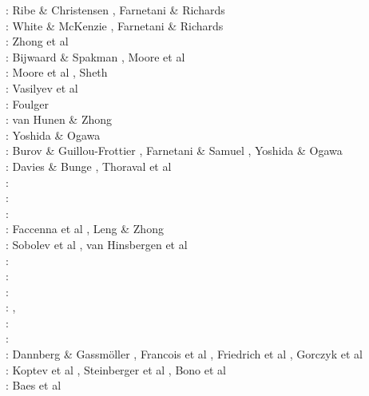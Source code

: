 \begin{scriptsize}
\nineteenninetyfour: Ribe \& Christensen \cite{rich94}, Farnetani \& Richards \cite{fari94}\\
\nineteenninetyfive: White \& McKenzie \cite{whmc95}, Farnetani \& Richards \cite{fari95}\\
\nineteenninetysix: Zhong et al \cite{zhgm96}\\
\nineteenninetyeight: Bijwaard \& Spakman \cite{bisp98}, Moore et al \cite{most98}\\
\nineteenninetynine: Moore et al \cite{most99}, Sheth \cite{shet99}\\
\twothousandone: Vasilyev et al \cite{vapy01}\\
\twothousandtwo: Foulger \cite{foul02}\\
\twothousandthree: van Hunen \& Zhong \cite{vazh03}\\
\twothousandfour: Yoshida \& Ogawa \cite{yoog04}\\
\twothousandfive: Burov \& Guillou-Frottier \cite{bugu05}, Farnetani \& Samuel \cite{fasa05}, 
                  Yoshida \& Ogawa \cite{yoog05}\\
\twothousandsix: Davies \& Bunge \cite{dabu06}, Thoraval et al \cite{thtd06}\\
\twothousandseven: \cite{stco07}\\
\twothousandeight: \cite{uegs08}\cite{slee08}\\
\twothousandnine: \cite{bucl09}\cite{zhgy09}\cite{baiv10}\cite{tabs09}\cite{maml09}\\
\twothousandten: Faccenna et al \cite{fabl10}, Leng \& Zhong \cite{lezh10}\\
\twothousandeleven: Sobolev et al \cite{sosk11}, van Hinsbergen et al \cite{vasd11}\\
\twothousandtwelve: \cite{huco12}\cite{gubc12}\cite{egim17}\\
\twothousandthirteen: \cite{bemm12}\cite{brps13}\\
\twothousandfourteen: \cite{buge14}\cite{gery14b}\cite{buto14}\cite{buit14}\cite{leli14}\\
\twothousandfifteen: \cite{bemm15}\cite{gesb15},
                     \cite{kocb15}\cite{meds15}\cite{lile15}\cite{medd15}\cite{frro15}\\
\twothousandsixteen: \cite{fige16}\cite{gadb16}\cite{kobc16}\\
\twothousandseventeen: \cite{bahf17}\cite{brsg17}\cite{bahf17}\cite{bekb17}\cite{kocb17}\\
\twothousandeighteen: Dannberg \& Gassm\"oller \cite{daga18}, Francois et al \cite{frkc18},
                      Friedrich et al \cite{frbr18}, Gorczyk et al \cite{gomb18}\\
\twothousandnineteen: Koptev et al \cite{kobg19}, Steinberger et al \cite{stbl19},
                      Bono et al \cite{botb19}\\
\twothousandtwenty: Baes et al \cite{basg20,basg20b}
\end{scriptsize}

